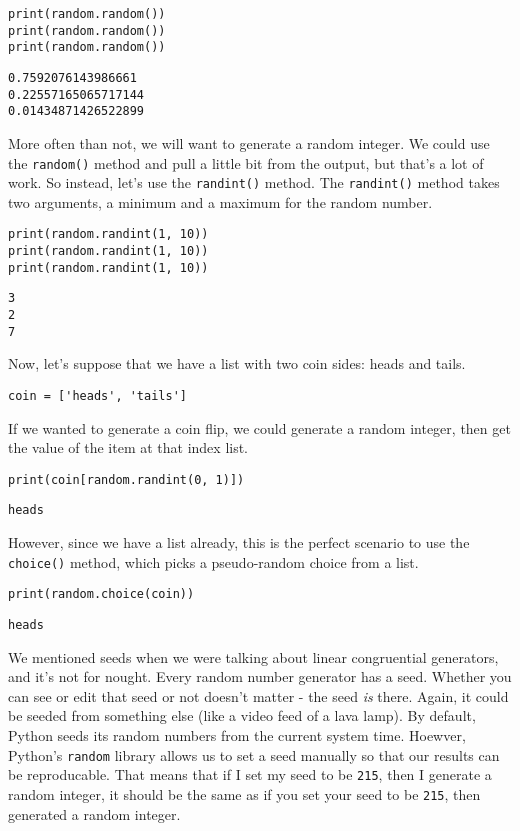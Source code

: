 \begin{lstlisting}[style=pippython]
print(random.random())
print(random.random())
print(random.random())
\end{lstlisting}
\begin{lstlisting}[style=none]
0.7592076143986661
0.22557165065717144
0.01434871426522899
\end{lstlisting}
More often than not, we will want to generate a random integer. We could use the \verb|random()| method and pull a little bit from the output, but that's a lot of work. So instead, let's use the \verb|randint()| method. The \verb|randint()| method takes two arguments, a minimum and a maximum for the random number.\par
\begin{lstlisting}[style=pippython]
print(random.randint(1, 10))
print(random.randint(1, 10))
print(random.randint(1, 10))
\end{lstlisting}
\begin{lstlisting}[style=none]
3
2
7
\end{lstlisting}
Now, let's suppose that we have a list with two coin sides: heads and tails.\par
\begin{lstlisting}[style=pippython]
coin = ['heads', 'tails']
\end{lstlisting}
If we wanted to generate a coin flip, we could generate a random integer, then get the value of the item at that index list.\par
\begin{lstlisting}[style=pippython]
print(coin[random.randint(0, 1)])
\end{lstlisting}
\begin{lstlisting}[style=none]
heads
\end{lstlisting}
However, since we have a list already, this is the perfect scenario to use the \verb|choice()| method, which picks a pseudo-random choice from a list.\par
\begin{lstlisting}[style=pippython]
print(random.choice(coin))
\end{lstlisting}
\begin{lstlisting}[style=none]
heads
\end{lstlisting}
We mentioned seeds when we were talking about linear congruential generators, and it's not for nought. Every random number generator has a seed. Whether you can see or edit that seed or not doesn't matter - the seed \textit{is} there. Again, it could be seeded from something else (like a video feed of a lava lamp). By default, Python seeds its random numbers from the current system time. Hoewver, Python's \verb|random| library allows us to set a seed manually so that our results can be reproducable. That means that if I set my seed to be \verb|215|, then I generate a random integer, it should be the same as if you set your seed to be \verb|215|, then generated a random integer.\par
